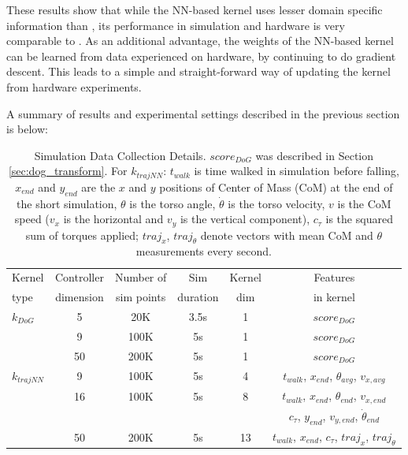 These results show that while the NN-based kernel uses lesser domain specific information than \dogkernel, its performance in simulation and hardware is very comparable to \dogkernel. As an additional advantage, the weights of the NN-based kernel can be learned from data experienced on hardware, by continuing to do gradient descent. This leads to a simple and straight-forward way of updating the kernel from hardware experiments. 

A summary of results and experimental settings described in the previous section is below:

\begin{table}[h!]
\centering
{}
\small{
\begin{tabular}{ lccccc } 
\toprule
Kernel & Controller & Number of & Sim & Kernel & Features \\
type & dimension & sim points & duration & dim & in kernel \\
\midrule
$k_{DoG}$ & 5 & 20K & 3.5s & 1 & $score_{DoG}$ \\ 
          & 9 & 100K & 5s & 1 & $score_{DoG}$ \\ 
     & 50 & 200K & 5s & 1 & $score_{DoG}$ \\ 
\hline
$k_{\textit{trajNN}}$ & 9 & 100K & 5s & 4 & $t_{walk}$, $x_{end}$, $\theta_{avg}$, $v_{x,avg}$\\ 
                      & 16 & 100K & 5s & 8 &
                $t_{walk}$, $x_{end}$, $\theta_{end}$, $v_{x,end}$\\
                & & & & & $c_{\tau}$,  $y_{end}$,  $v_{y,end}$, $\dot{\theta}_{end}$ \\ 
                      & 50 & 200K & 5s & 13 & $t_{walk}$, $x_{end}$, $c_{\tau}$, $\pmb{\textit{traj}}_{x}$, $\pmb{\textit{traj}}_{\theta}$ \\ 
\bottomrule
\end{tabular}
}
\caption{Simulation Data Collection Details. $score_{DoG}$ was described in Section \ref{sec:dog_transform}. For $k_{\textit{trajNN}}$: $t_{walk}$ is time walked in simulation before falling, $x_{end}$ and $y_{end}$ are the $x$ and $y$ positions of Center of Mass (CoM) at the end of the short simulation, $\theta$ is the torso angle, $\dot{\theta}$ is the torso velocity, $v$ is the CoM speed ($v_{x}$ is the horizontal and $v_y$ is the vertical component), $c_{\tau}$ is the squared sum of torques applied; $\pmb{\textit{traj}}_{x}$, $\pmb{\textit{traj}}_{\theta}$ denote vectors with mean CoM and $\theta$ measurements every second.}
\label{tbl:kernel_details}
\end{table}


